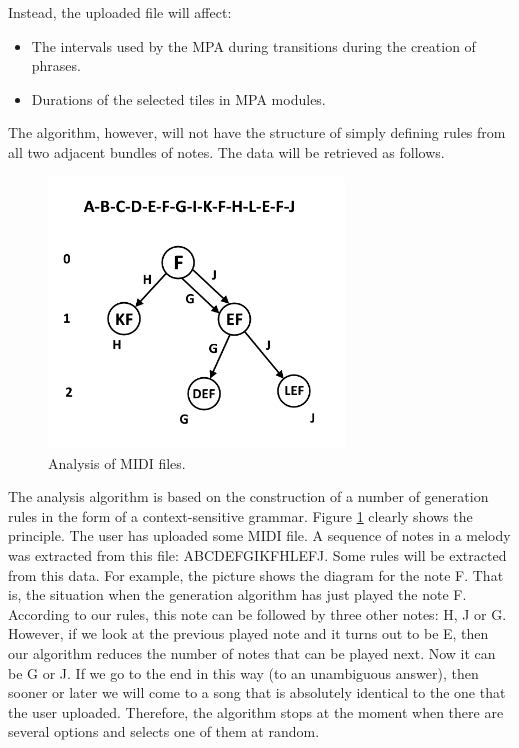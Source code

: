 \documentclass[thesis=B,english]{FITthesis}[2019/12/23]
\begin{document}
Instead, the uploaded file will affect:
\begin{itemize}
    \item The intervals used by the MPA during transitions during the creation of phrases.
    \item Durations of the selected tiles in MPA modules.
\end{itemize}

The algorithm, however, will not have the structure of simply defining rules from all two adjacent bundles of notes. The data will be retrieved as follows.

\begin{figure}[ht]
            \centering
            \includegraphics[width=0.7\textwidth]{Theory3.png}
            \caption{Analysis of MIDI files.}
            \label{fig:Theory3}
\end{figure}

The analysis algorithm is based on the construction of a number of generation rules in the form of a context-sensitive grammar. Figure \ref{fig:Theory3} clearly shows the principle. The user has uploaded some MIDI file. A sequence of notes in a melody was extracted from this file: ABCDEFGIKFHLEFJ. Some rules will be extracted from this data. For example, the picture shows the diagram for the note F. That is, the situation when the generation algorithm has just played the note F. According to our rules, this note can be followed by three other notes: H, J or G. However, if we look at the previous played note and it turns out to be E, then our algorithm reduces the number of notes that can be played next. Now it can be G or J. If we go to the end in this way (to an unambiguous answer), then sooner or later we will come to a song that is absolutely identical to the one that the user uploaded. Therefore, the algorithm stops at the moment when there are several options and selects one of them at random.
\end{document}
